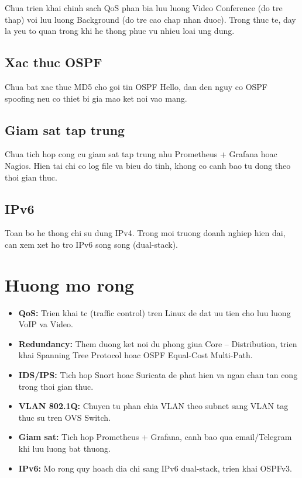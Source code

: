 Chua trien khai chinh sach QoS phan bia luu luong Video Conference (do tre thap) voi luu luong Background (do tre cao chap nhan duoc). Trong thuc te, day la yeu to quan trong khi he thong phuc vu nhieu loai ung dung.

\subsection{Xac thuc OSPF}

Chua bat xac thuc MD5 cho goi tin OSPF Hello, dan den nguy co OSPF spoofing neu co thiet bi gia mao ket noi vao mang.

\subsection{Giam sat tap trung}

Chua tich hop cong cu giam sat tap trung nhu Prometheus + Grafana hoac Nagios. Hien tai chi co log file va bieu do tinh, khong co canh bao tu dong theo thoi gian thuc.

\subsection{IPv6}

Toan bo he thong chi su dung IPv4. Trong moi truong doanh nghiep hien dai, can xem xet ho tro IPv6 song song (dual-stack).

\section{Huong mo rong}

\begin{itemize}
    \item \textbf{QoS:} Trien khai tc (traffic control) tren Linux de dat uu tien cho luu luong VoIP va Video.
    \item \textbf{Redundancy:} Them duong ket noi du phong giua Core -- Distribution, trien khai Spanning Tree Protocol hoac OSPF Equal-Cost Multi-Path.
    \item \textbf{IDS/IPS:} Tich hop Snort hoac Suricata de phat hien va ngan chan tan cong trong thoi gian thuc.
    \item \textbf{VLAN 802.1Q:} Chuyen tu phan chia VLAN theo subnet sang VLAN tag thuc su tren OVS Switch.
    \item \textbf{Giam sat:} Tich hop Prometheus + Grafana, canh bao qua email/Telegram khi luu luong bat thuong.
    \item \textbf{IPv6:} Mo rong quy hoach dia chi sang IPv6 dual-stack, trien khai OSPFv3.
\end{itemize}

